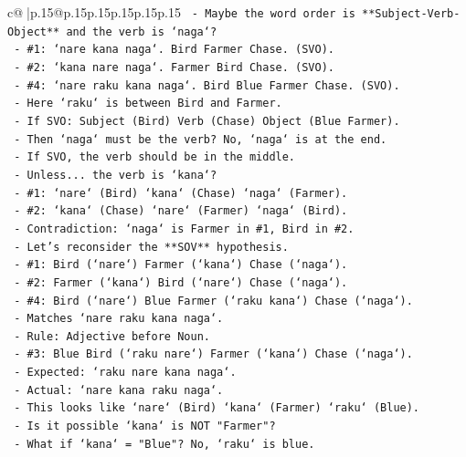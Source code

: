 \documentclass{article}
\begin{document}
{\begin{supertabular}{c@{$\;$}|p{.15\linewidth}@{}p{.15\linewidth}p{.15\linewidth}p{.15\linewidth}p{.15\linewidth}p{.15\linewidth}}
{{{\texttt{    {-} Maybe the word order is **Subject{-}Verb{-}Object** and the verb is `naga`?} \\
\texttt{      {-} \#1: `nare kana naga`. Bird Farmer Chase. (SVO).} \\
\texttt{      {-} \#2: `kana nare naga`. Farmer Bird Chase. (SVO).} \\
\texttt{      {-} \#4: `nare raku kana naga`. Bird Blue Farmer Chase. (SVO).} \\
\texttt{        {-} Here `raku` is between Bird and Farmer.} \\
\texttt{        {-} If SVO: Subject (Bird) Verb (Chase) Object (Blue Farmer).} \\
\texttt{        {-} Then `naga` must be the verb? No, `naga` is at the end.} \\
\texttt{        {-} If SVO, the verb should be in the middle.} \\
\texttt{        {-} Unless... the verb is `kana`?} \\
\texttt{          {-} \#1: `nare` (Bird) `kana` (Chase) `naga` (Farmer).} \\
\texttt{          {-} \#2: `kana` (Chase) `nare` (Farmer) `naga` (Bird).} \\
\texttt{            {-} Contradiction: `naga` is Farmer in \#1, Bird in \#2.} \\
\texttt{    {-} Let's reconsider the **SOV** hypothesis.} \\
\texttt{      {-} \#1: Bird (`nare`) Farmer (`kana`) Chase (`naga`).} \\
\texttt{      {-} \#2: Farmer (`kana`) Bird (`nare`) Chase (`naga`).} \\
\texttt{      {-} \#4: Bird (`nare`) Blue Farmer (`raku kana`) Chase (`naga`).} \\
\texttt{        {-} Matches `nare raku kana naga`.} \\
\texttt{        {-} Rule: Adjective before Noun.} \\
\texttt{      {-} \#3: Blue Bird (`raku nare`) Farmer (`kana`) Chase (`naga`).} \\
\texttt{        {-} Expected: `raku nare kana naga`.} \\
\texttt{        {-} Actual: `nare kana raku naga`.} \\
\texttt{        {-} This looks like `nare` (Bird) `kana` (Farmer) `raku` (Blue).} \\
\texttt{        {-} Is it possible `kana` is NOT "Farmer"?} \\
\texttt{        {-} What if `kana` = "Blue"? No, `raku` is blue.} \\
}}}
\end{supertabular}}
\end{document}
